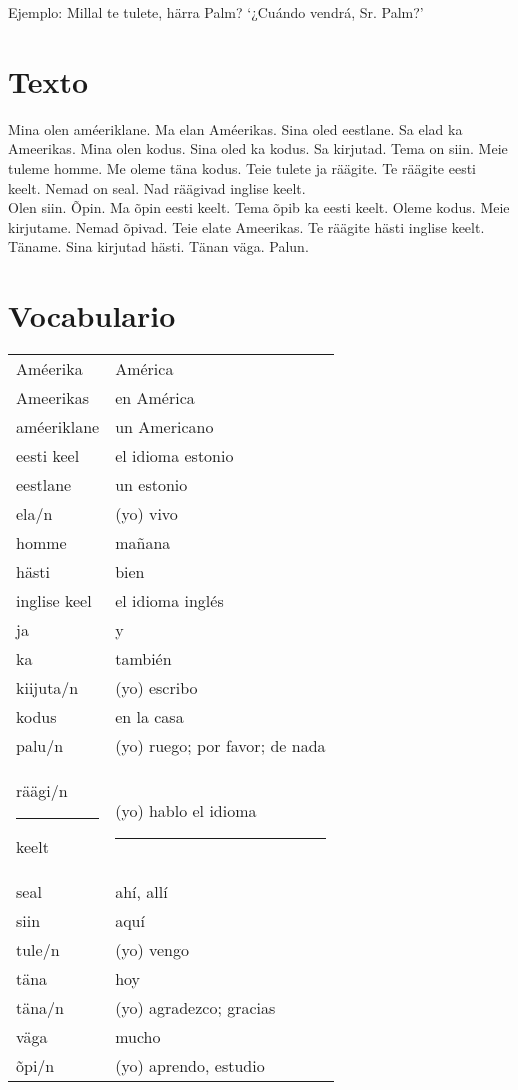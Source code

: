 Ejemplo: Millal te tulete, härra Palm? `¿Cuándo vendrá, Sr. Palm?'\\

\section*{\Large{Texto}}

Mina olen améeriklane. Ma elan Améerikas. Sina oled eestlane. Sa elad ka Ameerikas. Mina olen kodus. Sina oled ka kodus. Sa kirjutad. Tema on siin. Meie tuleme homme. Me oleme täna kodus. Teie tulete ja räägite. Te räägite eesti keelt. Nemad on seal. Nad räägivad inglise keelt.\\

Olen siin. Õpin. Ma õpin eesti keelt. Tema õpib ka eesti keelt. Oleme kodus. Meie kirjutame. Nemad õpivad. Teie elate Ameerikas. Te räägite hästi inglise keelt. Täname. Sina kirjutad hästi. Tänan väga. Palun.\\

\section*{\Large{Vocabulario}}

\begin{tabular}{ l l }
	Améerika 							& América \\
	Ameerikas 							& en América \\
	améeriklane 						& un Americano \\
	eesti keel 							& el idioma estonio \\
	eestlane 							& un estonio \\
	ela/n 								& (yo) vivo \\
	homme 								& mañana \\
	hästi 								& bien \\
	inglise keel 						& el idioma inglés \\
	ja 									& y \\
	ka 									& también \\
	kiijuta/n 							& (yo) escribo \\
	kodus 								& en la casa \\
	palu/n 								& (yo) ruego; por favor; de nada \\
	räägi/n	\rule{1cm}{0.4pt} keelt 	& (yo) hablo el idioma \rule{1cm}{0.4pt} \\
	seal 								& ahí, allí \\
	siin 								& aquí \\
	tule/n 								& (yo) vengo \\
	täna 								& hoy \\
	täna/n 								& (yo) agradezco; gracias\\
	väga 								& mucho \\
	õpi/n 								& (yo) aprendo, estudio
\end{tabular}\\ \bigskip


